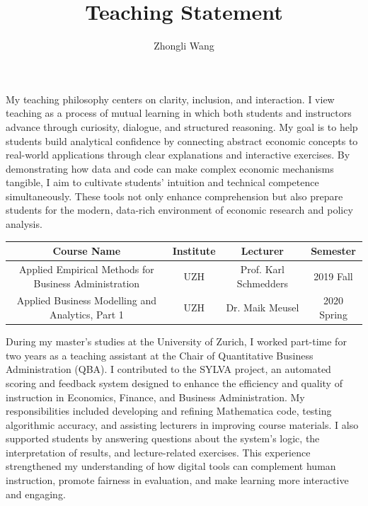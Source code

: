 \documentclass{nfr}
\title{Teaching Statement}
\author{Zhongli Wang}
\begin{document}

% 
% 
% 
% 


\maketitle

My teaching philosophy centers on clarity, inclusion, and interaction. I view teaching as a process of mutual learning in which both students and instructors advance through curiosity, dialogue, and structured reasoning. My goal is to help students build analytical confidence by connecting abstract economic concepts to real-world applications through clear explanations and interactive exercises. By demonstrating how data and code can make complex economic mechanisms tangible, I aim to cultivate students’ intuition and technical competence simultaneously. These tools not only enhance comprehension but also prepare students for the modern, data-rich environment of economic research and policy analysis.

\begin{center}
\small{
\begin{tabular}{||c c c c||} 
 \hline
 Course Name & Institute & Lecturer & Semester \\ [0.5ex] 
 \hline\hline
 Applied Empirical Methods for Business Administration & UZH & Prof. Karl Schmedders & 2019 Fall \\ 
 \hline
 Applied Business Modelling and Analytics, Part 1 & UZH & Dr. Maik Meusel & 2020 Spring \\
 \hline
\end{tabular}}
\end{center}

During my master’s studies at the University of Zurich, I worked part-time for two years as a teaching assistant at the Chair of Quantitative Business Administration (QBA). I contributed to the SYLVA project, an automated scoring and feedback system designed to enhance the efficiency and quality of instruction in Economics, Finance, and Business Administration. My responsibilities included developing and refining Mathematica code, testing algorithmic accuracy, and assisting lecturers in improving course materials. I also supported students by answering questions about the system’s logic, the interpretation of results, and lecture-related exercises. This experience strengthened my understanding of how digital tools can complement human instruction, promote fairness in evaluation, and make learning more interactive and engaging.\\
\end{document}
